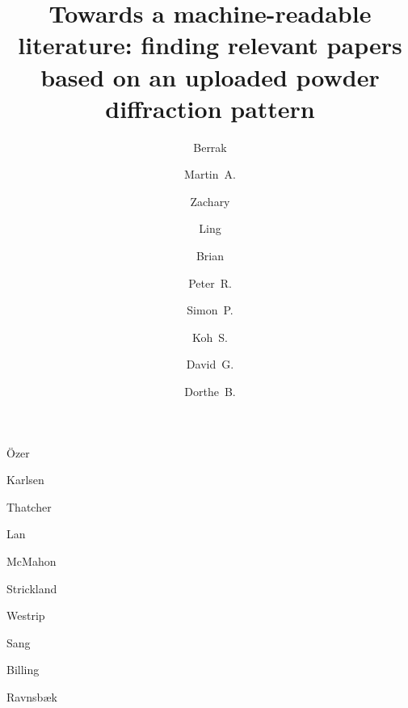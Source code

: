 \documentclass[preprint]{iucr}
\begin{document}




\title{Towards a machine-readable literature: finding relevant papers based on an uploaded powder diffraction pattern}

\author[a,\dagger]{Berrak}{Özer}%
\author[b,\dagger]{Martin~A.}{Karlsen}%
\author[a]{Zachary}{Thatcher}%
\author[a]{Ling}{Lan}%
\author[d]{Brian}{McMahon}%
\author[d]{Peter~R.}{Strickland}%
\author[d]{Simon~P.}{Westrip}%
\author[d]{Koh~S.}{Sang}%
\author[e]{David~G.}{Billing}%
\author[f]{Dorthe~B.}{Ravnsbæk}%
\end{document}
